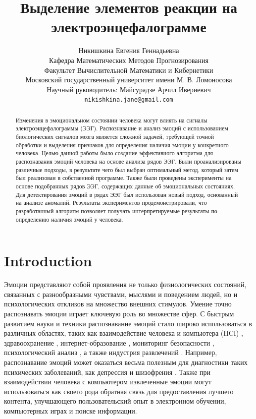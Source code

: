\documentclass{article}
\title{Выделение элементов реакции на электроэнцефалограмме}
\author{ Никишкина Евгения Геннадьевна \\
    Кафедра Математических Методов Прогнозирования\\
	Факультет Вычислительной Математики и Кибернетики\\
	Московский государственный университет имени М. В. Ломоносова\\
    Научный руководитель: Майсурадзе Арчил Ивериевич \\
	\texttt{nikishkina.jane@gmail.com} \\
	} \\
\date{}
\begin{document}
\maketitle

\begin{abstract}
	Изменения в эмоциональном состоянии человека могут влиять на сигналы электроэнцефалограммы (ЭЭГ). Распознавание и анализ эмоций с использованием биологических сигналов мозга является сложной задачей, требующей точной обработки и выделения признаков для определения наличия эмоции у конкретного человека. Целью данной работы было создание эффективного алгоритма для распознавания эмоций человека на основе анализа рядов ЭЭГ. Были проанализированы различные подходы, в результате чего был выбран оптимальный метод, который затем был реализован в собственной программе. Также были проведены эксперименты на основе подобранных рядов ЭЭГ, содержащих данные об эмоциональных состояниях. Для детектирования эмоций в рядах ЭЭГ был использован новый подход, основанный на анализе аномалий. Результаты экспериментов продемонстрировали, что разработанный алгоритм позволяет получать интерпретируемые результаты по определению наличия эмоций у человека.
\end{abstract}



\section{Introduction}
Эмоции представляют собой проявления не только физиологических состояний, связанных с разнообразными чувствами, мыслями и поведением людей, но и психологических откликов на множество внешних стимулов. Умение точно распознавать эмоции играет ключевую роль во множестве сфер. С быстрым развитием науки и техники распознавание эмоций стало широко использоваться в различных областях, таких как взаимодействие человека и компьютера (HCI) \citep{HCI}, здравоохранение \citep{healtcare}, интернет-образование \citep{inted}, мониторинг безопасности \citep{security}, психологический анализ \citep{psych}, а также индустрия развлечений \citep{entern}. Например, распознавание эмоций может оказаться весьма полезным для диагностики таких психических заболеваний, как депрессия и шизофрения \citep{schizophrenia}. Также при взаимодействии человека с компьютером извлеченные эмоции могут использоваться как своего рода обратная связь для предоставления лучшего контента, улучшающего пользовательский опыт в электронном обучении, компьютерных играх и поиске информации.
\end{document}
